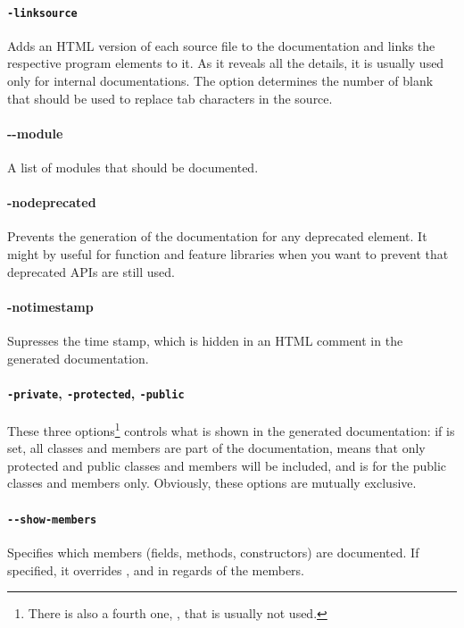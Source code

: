 \paragraph{\texttt{-linksource}}\label{par:linksource} Adds an HTML version of each source file to the documentation and links the respective program elements to it. As it reveals all the details, it is usually used only for internal documentations. The option  determines the number of blank that should be used to replace tab characters in the source.

\paragraph{-{}-module} A list of modules that should be documented.

\paragraph{-nodeprecated} Prevents the generation of the documentation for any deprecated element. It might by useful for function and feature libraries when you want to prevent that deprecated APIs are still used. 

\paragraph{-notimestamp} Supresses the time stamp, which is hidden in an HTML comment in the generated documentation.

\paragraph{\texttt{-private}, \texttt{-protected}, \texttt{-public}} These three options\footnote{There is also a fourth one, \mbox{}, that is usually not used.} controls what is shown in the generated documentation: if \mbox{} is set, all classes and members are part of the documentation, \mbox{} means that only protected and public classes and members will be included, and \mbox{} is for the public classes and members only. Obviously, these options are mutually exclusive.

\paragraph{\texttt{-{}-show-members}} Specifies which members (fields, methods, constructors) are documented. If specified, it overrides \mbox{}, \mbox{} and \mbox{} in regards of the members.

